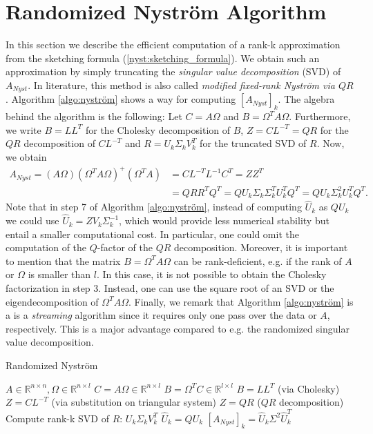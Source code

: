 \documentclass{article}
\theoremstyle{definition}
\begin{document}
\section{Randomized Nyström Algorithm}
In this section we describe the efficient computation of a rank-k approximation from the sketching formula (\ref{nyst:sketching_formula}). We obtain such an approximation by simply truncating the \textit{singular value decomposition} (SVD) of $A_{Nyst}$. In literature, this method is also called \textit{modified fixed-rank Nyström via $QR$}. Algorithm \ref{algo:nyström} shows a way for computing $[A_{Nyst}]_k$. The algebra behind the algorithm is the following: Let $C = A \Omega$ and $B = \Omega^T A \Omega$. Furthermore, we write $B = LL^T$ for the Cholesky decomposition of $B$, $Z = C L^{-T} = QR$ for the $QR$ decomposition of $C L^{-T}$ and $R = U_k \Sigma_k V_k^T$ for the truncated SVD of $R$. Now, we obtain
\begin{align*}
    A_{Nyst} = (A \Omega) (\Omega^T A \Omega)^+ (\Omega^T A) &= CL^{-T}L^{-1}C^T = ZZ^T \\
    &= QRR^TQ^T = QU_k\Sigma_k \Sigma_k^T U_k^TQ^T = QU_k\Sigma_k^2 U_k^TQ^T.
\end{align*}
 Note that in step 7 of Algorithm \ref{algo:nyström}, instead of computing $\hat{U}_k$ as $Q U_k$ we could use $\hat{U}_k = Z V_k \Sigma_k^{-1}$, which would provide less numerical stability but entail a smaller computational cost. In particular, one could omit the computation of the $Q$-factor of the $QR$ decomposition. Moreover, it is important to mention that the matrix $B = \Omega^T A \Omega$ can be rank-deficient, e.g. if the rank of $A$ or $\Omega$ is smaller than $l$. In this case, it is not possible to obtain the Cholesky factorization in step 3. Instead, one can use the square root of an SVD or the eigendecomposition of $\Omega^T A \Omega$. Finally, we remark that Algorithm \ref{algo:nyström} is a is a \textit{streaming} algorithm since it requires only one pass over the data or $A$, respectively. This is a major advantage compared to e.g. the randomized singular value decomposition.
\begin{algorithm}[H]
    \caption{Randomized Nyström} \label{algo:nyström}
    \begin{algorithmic}[1]
        \Require $A \in \mathbb{R}^{n \times n}, \Omega \in \mathbb{R}^{n \times l}$
        \State $C = A \Omega \in \mathbb{R}^{n \times l}$
        \State $B = \Omega^T C \in \mathbb{R}^{l \times l}$
        \State $B = LL^T$ (via Cholesky)
        \State $Z = C L^{-T}$ (via substitution on triangular system)
        \State $Z = QR$ ($QR$ decomposition)
        \State Compute rank-k SVD of $R$: $U_k \Sigma_k V_k^T$
        \State $\hat{U}_k = Q U_k$
        \Ensure $[A_{Nyst}]_k = \hat{U}_k \Sigma^2 \hat{U}_k^T$
    \end{algorithmic}
\end{algorithm}
\end{document}
